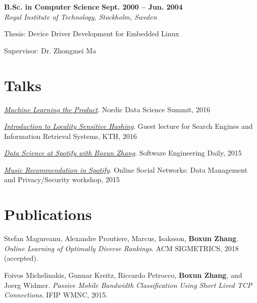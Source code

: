 \documentclass[margin,line]{resume}
\begin{document}
\begin{resume}
\textbf{B.Sc. in Computer Science} \hfill \textbf{Sept. 2000 -- Jun. 2004} \vspace{0.75mm} \\%
\textsl{Royal Institute of Technology, Stockholm, Sweden} \vspace{-2.5mm} \\
\begin{list2}
    \item Thesis: Device Driver Development for Embedded Linux
    \item Supervisor: Dr. Zhongmei Ma
\end{list2}\vspace{-1.5mm}

\section{\mysidestyle Talks}
\href{http://www.slideshare.net/BoxunZhang/machine-learning-the-product}{\emph{Machine Learning the Product}}. Nordic Data Science Summit, 2016

\vspace{-3mm}
\href{https://www.kth.se/social/files/573d8d10f276545b25e543c9/guest_lecture_DD2476_2016_Boxun.pdf}{\emph{Introduction to Locality Sensitive Hashing}}.
Guest lecture for Search Engines and Information Retrieval Systems, KTH, 2016

\vspace{-3mm}
\href{http://softwareengineeringdaily.com/2015/12/11/data-science-at-spotify-with-boxun-zhang/}{\emph{Data Science at Spotify with Boxun Zhang}}.
Software Engineering Daily, 2015

\vspace{-3mm}
\href{http://linc.ucy.ac.cy/isocial/images/stories/Events/Crete_workshop/Speaker%20Slides/Speaker%20Slides/NOT%20FOR%20WEB%20music_recommendation_spotify.pdf}{\emph{Music Recommendation in Spotify}}.
Online Social Networks: Data Management and Privacy/Security workshop, 2015

\section{\mysidestyle Publications}
Stefan Magureanu, Alexandre Proutiere, Marcus, Isaksson, \textbf{Boxun Zhang}.
\textit{Online Learning of Optimally Diverse Rankings}. ACM SIGMETRICS, 2018 (accepted).

Foivos Michelinakis, Gunnar Kreitz, Riccardo Petrocco, \textbf{Boxun Zhang}, and Joerg
Widmer. \textit{Passive Mobile Bandwidth Classification Using Short Lived TCP
Connections}. IFIP WMNC, 2015.


\end{resume}
\end{document}
